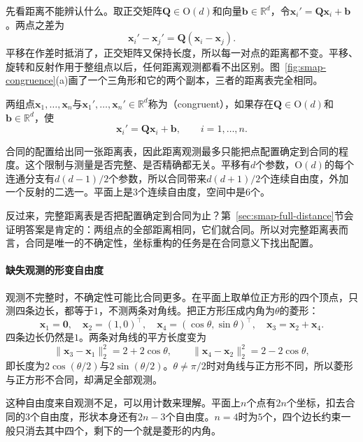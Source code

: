 先看距离不能辨认什么。取正交矩阵$\bm Q\in\mathrm O(d)$和向量$\bm b\in\mathbb R^d$，令$\bm x_i'=\bm Q\bm x_i+\bm b$。两点之差为
\[
 \bm x_i'-\bm x_j'=\bm Q(\bm x_i-\bm x_j).
\]
平移在作差时抵消了，正交矩阵又保持长度，所以每一对点的距离都不变。平移、旋转和反射作用于整组点以后，任何距离观测都看不出区别。图~\ref{fig:smap-congruence}(a)画了一个三角形和它的两个副本，三者的距离表完全相同。

\begin{definition}[合同的点配置]
\label{def:smap-congruent}
两组点$\bm x_1,\ldots,\bm x_n$与$\bm x_1',\ldots,\bm x_n'\in\mathbb R^d$称为（congruent），如果存在$\bm Q\in\mathrm O(d)$和$\bm b\in\mathbb R^d$，使
\begin{equation}
 \bm x_i'=\bm Q\bm x_i+\bm b,\qquad i=1,\ldots,n .
 \label{eq:smap-congruence}
\end{equation}
\end{definition}

合同的配置给出同一张距离表，因此距离观测最多只能把点配置确定到合同的程度。这个限制与测量是否完整、是否精确都无关。平移有$d$个参数，$\mathrm O(d)$的每个连通分支有$d(d-1)/2$个参数，所以合同带来$d(d+1)/2$个连续自由度，外加一个反射的二选一。平面上是$3$个连续自由度，空间中是$6$个。

反过来，完整距离表是否把配置确定到合同为止？第~\ref{sec:smap-full-distance}节会证明答案是肯定的：两组点的全部距离相同，它们就合同。所以对完整距离表而言，合同是唯一的不确定性，坐标重构的任务是在合同意义下找出配置。

\paragraph{缺失观测的形变自由度}

观测不完整时，不确定性可能比合同更多。在平面上取单位正方形的四个顶点，只测四条边长，都等于$1$，不测两条对角线。把正方形压成内角为$\theta$的菱形：
\[
 \bm x_1=\bm0,\quad \bm x_2=(1,0)^\top,\quad \bm x_4=(\cos\theta,\sin\theta)^\top,\quad \bm x_3=\bm x_2+\bm x_4 .
\]
四条边长仍然是$1$。两条对角线的平方长度变为
\[
 \lVert\bm x_3-\bm x_1\rVert_2^2=2+2\cos\theta,\qquad
 \lVert\bm x_4-\bm x_2\rVert_2^2=2-2\cos\theta ,
\]
即长度为$2\cos(\theta/2)$与$2\sin(\theta/2)$。$\theta\neq\pi/2$时对角线与正方形不同，所以菱形与正方形不合同，却满足全部观测。

这种自由度来自观测不足，可以用计数来理解。平面上$n$个点有$2n$个坐标，扣去合同的$3$个自由度，形状本身还有$2n-3$个自由度。$n=4$时为$5$个，四个边长约束一般只消去其中四个，剩下的一个就是菱形的内角。

